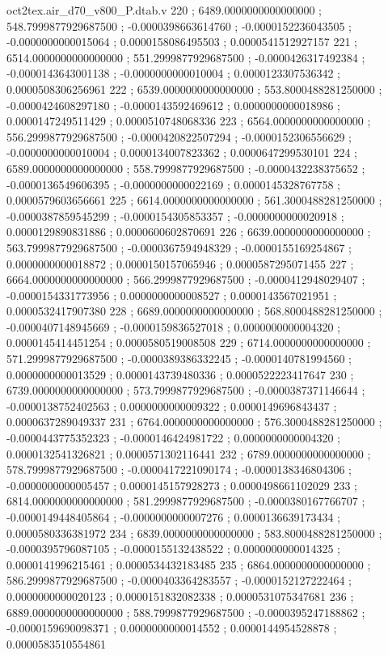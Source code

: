 \begin{filecontents}[overwrite]{oct2tex.air_d70_v800_P.dtab.v}
220 ; 6489.0000000000000000 ; 548.7999877929687500 ; -0.0000398663614760 ; -0.0000152236043505 ; -0.0000000000015064 ; 0.0000158086495503 ; 0.0000541512927157
221 ; 6514.0000000000000000 ; 551.2999877929687500 ; -0.0000426317492384 ; -0.0000143643001138 ; -0.0000000000010004 ; 0.0000123307536342 ; 0.0000508306256961
222 ; 6539.0000000000000000 ; 553.8000488281250000 ; -0.0000424608297180 ; -0.0000143592469612 ; 0.0000000000018986 ; 0.0000147249511429 ; 0.0000510748068336
223 ; 6564.0000000000000000 ; 556.2999877929687500 ; -0.0000420822507294 ; -0.0000152306556629 ; -0.0000000000010004 ; 0.0000134007823362 ; 0.0000647299530101
224 ; 6589.0000000000000000 ; 558.7999877929687500 ; -0.0000432238375652 ; -0.0000136549606395 ; -0.0000000000022169 ; 0.0000145328767758 ; 0.0000579603656661
225 ; 6614.0000000000000000 ; 561.3000488281250000 ; -0.0000387859545299 ; -0.0000154305853357 ; -0.0000000000020918 ; 0.0000129890831886 ; 0.0000600602870691
226 ; 6639.0000000000000000 ; 563.7999877929687500 ; -0.0000367594948329 ; -0.0000155169254867 ; 0.0000000000018872 ; 0.0000150157065946 ; 0.0000587295071455
227 ; 6664.0000000000000000 ; 566.2999877929687500 ; -0.0000412948029407 ; -0.0000154331773956 ; 0.0000000000008527 ; 0.0000143567021951 ; 0.0000532417907380
228 ; 6689.0000000000000000 ; 568.8000488281250000 ; -0.0000407148945669 ; -0.0000159836527018 ; 0.0000000000004320 ; 0.0000145414451254 ; 0.0000580519008508
229 ; 6714.0000000000000000 ; 571.2999877929687500 ; -0.0000389386332245 ; -0.0000140781994560 ; 0.0000000000013529 ; 0.0000143739480336 ; 0.0000522223417647
230 ; 6739.0000000000000000 ; 573.7999877929687500 ; -0.0000387371146644 ; -0.0000138752402563 ; 0.0000000000009322 ; 0.0000149696843437 ; 0.0000637289049337
231 ; 6764.0000000000000000 ; 576.3000488281250000 ; -0.0000443775352323 ; -0.0000146424981722 ; 0.0000000000004320 ; 0.0000132541326821 ; 0.0000571302116441
232 ; 6789.0000000000000000 ; 578.7999877929687500 ; -0.0000417221090174 ; -0.0000138346804306 ; -0.0000000000005457 ; 0.0000145157928273 ; 0.0000498661102029
233 ; 6814.0000000000000000 ; 581.2999877929687500 ; -0.0000380167766707 ; -0.0000149448405864 ; -0.0000000000007276 ; 0.0000136639173434 ; 0.0000580336381972
234 ; 6839.0000000000000000 ; 583.8000488281250000 ; -0.0000395796087105 ; -0.0000155132438522 ; 0.0000000000014325 ; 0.0000141996215461 ; 0.0000534432183485
235 ; 6864.0000000000000000 ; 586.2999877929687500 ; -0.0000403364283557 ; -0.0000152127222464 ; 0.0000000000020123 ; 0.0000151832082338 ; 0.0000531075347681
236 ; 6889.0000000000000000 ; 588.7999877929687500 ; -0.0000395247188862 ; -0.0000159690098371 ; 0.0000000000014552 ; 0.0000144954528878 ; 0.0000583510554861

\end{filecontents}
